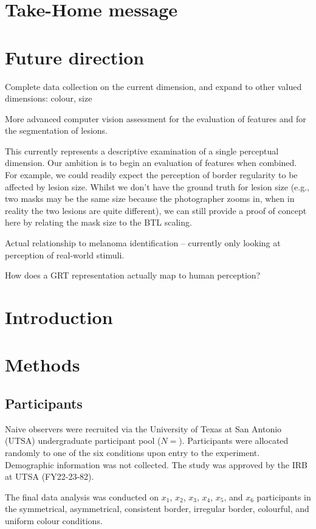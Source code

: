 \documentclass[a4paper, natbib, doc, 12pt]{apa7}
\begin{document}
\section{Take-Home message}


\section{Future direction}
Complete data collection on the current dimension, and expand to other valued dimensions: colour, size

More advanced computer vision assessment for the evaluation of features and for the segmentation of lesions.

This currently represents a descriptive examination of a single perceptual dimension. Our ambition is to begin an evaluation of features when combined. For example, we could readily expect the perception of border regularity to be affected by lesion size. Whilst we don't have the ground truth for lesion size (e.g., two masks may be the same size because the photographer zooms in, when in reality the two lesions are quite different), we can still provide a proof of concept here by relating the mask size to the BTL scaling.

Actual relationship to melanoma identification -- currently only looking at perception of real-world stimuli.

How does a GRT representation actually map to human perception?


\newpage


\section{Introduction}

\section{Methods}
\subsection{Participants}
Naive observers were recruited via the University of Texas at San Antonio (UTSA) undergraduate participant pool ($N= $). Participants were allocated randomly to one of the six conditions upon entry to the experiment. Demographic information was not collected. The study was approved by the IRB at UTSA (FY22-23-82). 

The final data analysis was conducted on $x_{1}$, $x_{2}$, $x_{3}$, $x_{4}$, $x_{5}$, and $x_{6}$ participants in the symmetrical, asymmetrical,  consistent border, irregular border, colourful, and uniform colour conditions. 
\end{document}
